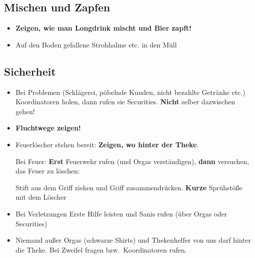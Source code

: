 \subsection{Mischen und Zapfen}
\begin{itemize}
  \renewcommand{\labelitemi}{$\Box$}
  \item \textbf{Zeigen, wie man Longdrink mischt und Bier zapft!}
  \item Auf den Boden gefallene Strohhalme etc. in den Müll
\end{itemize}
\subsection{Sicherheit}
\begin{itemize}
  \renewcommand{\labelitemi}{$\Box$}
  \item Bei Problemen (Schlägerei, pöbelnde Kunden, nicht bezahlte Getränke etc.) Koordinatoren holen, dann rufen sie Securities. \textbf{Nicht} selber dazwischen gehen!
  \item \textbf{Fluchtwege zeigen!}
  \item Feuerlöscher stehen bereit: \textbf{Zeigen, wo hinter der Theke}.
    
    Bei Feuer: \textbf{Erst} Feuerwehr rufen (und Orgas verständigen), \textbf{dann} versuchen, das Feuer zu löschen:
    
    Stift aus dem Griff ziehen und Griff zusammendrücken. \textbf{Kurze} Sprühstöße mit dem Löscher
  \item Bei Verletzungen Erste Hilfe leisten und Sanis rufen (über Orgas oder Securities)
  \item Niemand außer Orgas (schwarze Shirts) und Thekenhelfer von uns darf hinter die Theke. Bei Zweifel fragen bzw.\ Koordinatoren rufen.
\end{itemize}
